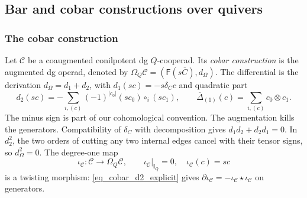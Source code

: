 \documentclass[11pt,letterpaper]{article}
\numberwithin{equation}{section}
\theoremstyle{plain}
\theoremstyle{definition}
\theoremstyle{remark}
\begin{document}
\subsection{Bar and cobar constructions over quivers}
\label{ss_bar_cobar}
\subsubsection{The cobar construction}
\label{sss_cobar}
Let $\mathscr C$ be a coaugmented conilpotent dg $Q$-cooperad. Its \textit{cobar construction} is the augmented dg operad, denoted by $\Omega_Q\mathscr C=(\mathsf F(s\overline C),d_\Omega)$.
The differential is the derivation $d_\Omega=d_1+d_2$, with $d_1(sc)=-s\delta_Cc$ and quadratic part
\begin{equation}\label{eq_cobar_d2_explicit}
 d_2(sc)=-\sum_{i,(c)}(-1)^{|c_0|}(sc_0)\circ_i(sc_1),
 \qquad \overline\Delta_{(1)}(c)=\sum_{i,(c)}c_0\otimes c_1.
\end{equation}
The minus sign is part of our cohomological convention. The augmentation kills the generators. Compatibility of $\delta_C$ with decomposition gives $d_1d_2+d_2d_1=0$. In $d_2^2$, the two orders of cutting any two internal edges cancel with their tensor signs, so $d_\Omega^2=0$.
The degree-one map
\begin{equation*}\iota_{\mathscr C}:\mathscr C\longrightarrow\Omega_Q\mathscr C,
\qquad \iota_{\mathscr C}|_{\mathbb I_Q}=0,\quad \iota_{\mathscr C}(c)=sc
\end{equation*}
is a twisting morphism: \eqref{eq_cobar_d2_explicit} gives
$\partial\iota_{\mathscr C}=-\iota_{\mathscr C}\star\iota_{\mathscr C}$ on generators.
\end{document}
